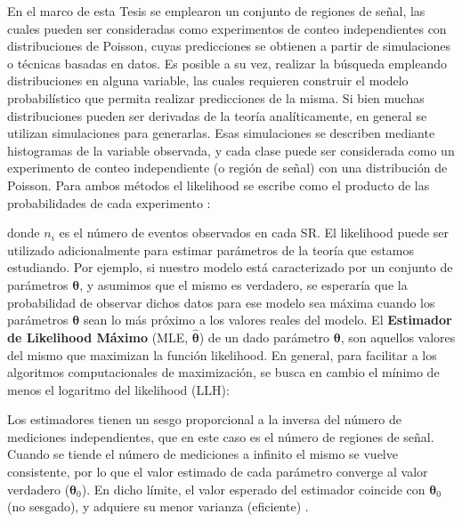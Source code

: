 En el marco de esta Tesis se emplearon un conjunto de regiones de señal, las cuales pueden ser consideradas como experimentos de conteo independientes con distribuciones de Poisson, cuyas predicciones se obtienen a partir de simulaciones o técnicas basadas en datos. 
Es posible a su vez, realizar la búsqueda empleando distribuciones en alguna variable, las cuales requieren construir el modelo probabilístico que permita realizar predicciones de la misma. Si bien muchas distribuciones pueden ser derivadas de la teoría analíticamente, en general se utilizan simulaciones para generarlas. Esas simulaciones se describen mediante histogramas de la variable observada, y cada clase puede ser considerada como un experimento de conteo independiente (o región de señal) con una distribución de Poisson. 
Para ambos métodos el likelihood se escribe como el producto de las probabilidades de cada experimento \cite{cowan_book}:


 donde $n_i$ es el número de eventos observados en cada SR. 
El likelihood puede ser utilizado adicionalmente para estimar parámetros de la teoría que estamos estudiando. Por ejemplo, si nuestro modelo está caracterizado por un conjunto de parámetros $\bm{\theta}$, y asumimos que el mismo es verdadero, se esperaría que la probabilidad de observar dichos datos para ese modelo sea máxima cuando los parámetros $\bm{\theta}$ sean lo más próximo a los valores reales del modelo. El \textbf{Estimador de Likelihood Máximo} (MLE, $\hat{\bm{\theta}}$) de un dado parámetro $\bm{\theta}$, son aquellos valores del mismo que maximizan la función likelihood. En general, para facilitar a los algoritmos computacionales de maximización, se busca en cambio el mínimo de menos el logaritmo del likelihood (LLH):

Los estimadores tienen un sesgo proporcional a la inversa del número de mediciones independientes, que en este caso es el número de regiones de señal. Cuando se tiende el número de mediciones a infinito el mismo se vuelve consistente, por lo que el valor estimado de cada parámetro converge al valor verdadero ($\bm{\theta}_0$). En dicho límite, el valor esperado del estimador coincide con $\bm{\theta}_0$ (no sesgado), y adquiere su menor varianza (eficiente) \cite{cowan_book}.

